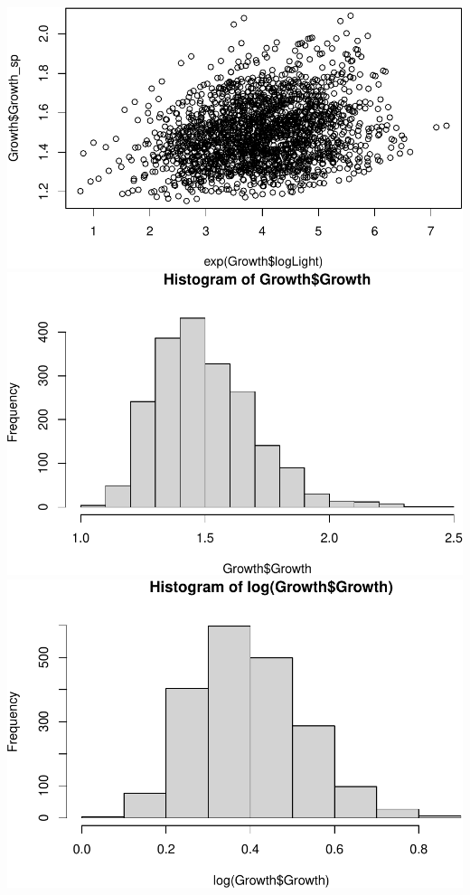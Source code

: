\documentclass[
]{article}
\begin{document}
\includegraphics{theoretical_model_files/figure-latex/Growth plots-4.pdf}
\includegraphics{theoretical_model_files/figure-latex/Growth plots-5.pdf}
\includegraphics{theoretical_model_files/figure-latex/Growth plots-6.pdf}
\end{document}
